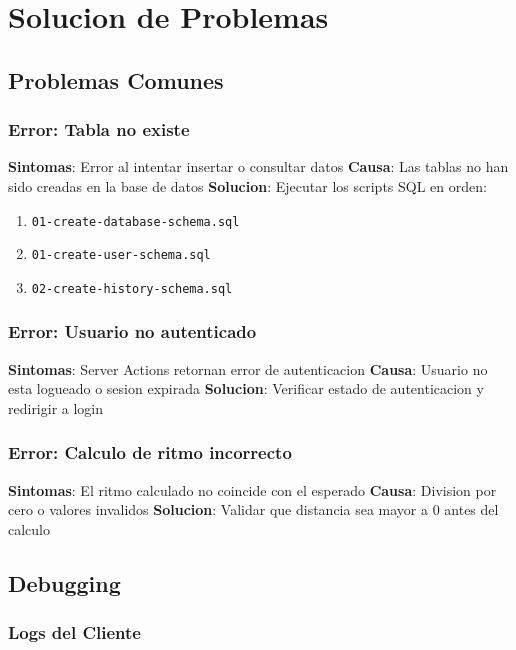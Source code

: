 \documentclass[12pt,a4paper]{article}
\begin{document}
\section{Solucion de Problemas}

\subsection{Problemas Comunes}

\subsubsection{Error: Tabla no existe}

\textbf{Sintomas}: Error al intentar insertar o consultar datos
\textbf{Causa}: Las tablas no han sido creadas en la base de datos
\textbf{Solucion}: Ejecutar los scripts SQL en orden:
\begin{enumerate}
    \item \texttt{01-create-database-schema.sql}
    \item \texttt{01-create-user-schema.sql}
    \item \texttt{02-create-history-schema.sql}
\end{enumerate}

\subsubsection{Error: Usuario no autenticado}

\textbf{Sintomas}: Server Actions retornan error de autenticacion
\textbf{Causa}: Usuario no esta logueado o sesion expirada
\textbf{Solucion}: Verificar estado de autenticacion y redirigir a login

\subsubsection{Error: Calculo de ritmo incorrecto}

\textbf{Sintomas}: El ritmo calculado no coincide con el esperado
\textbf{Causa}: Division por cero o valores invalidos
\textbf{Solucion}: Validar que distancia sea mayor a 0 antes del calculo

\subsection{Debugging}

\subsubsection{Logs del Cliente}
\end{document}
